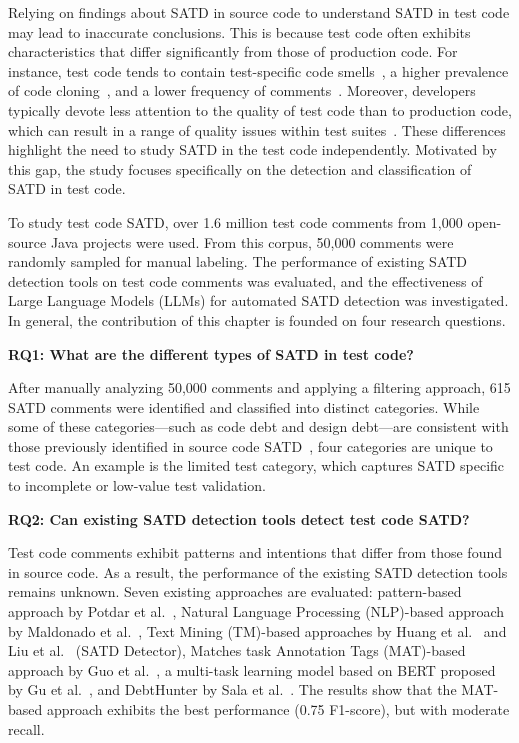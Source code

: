 Relying on findings about SATD in source code to understand SATD in test code may lead to inaccurate conclusions. This is because test code often exhibits characteristics that differ significantly from those of production code. For instance, test code tends to contain test-specific code smells~\cite{bavota_are_2015, tufano_empirical_2016}, a higher prevalence of code cloning~\cite{van_bladel_comparative_2023}, and a lower frequency of comments~\cite{counsell_comparing_2016}. Moreover, developers typically devote less attention to the quality of test code than to production code, which can result in a range of quality issues within test suites~\cite{counsell_comparing_2016, beller_developer_2019, beller_when_2015, zaidman_studying_2011, athanasiou_test_2014, spadini_relation_2018}. These differences highlight the need to study SATD in the test code independently. Motivated by this gap, the study focuses specifically on the detection and classification of SATD in test code.

 To study test code SATD, over 1.6 million test code comments from 1,000 open-source Java projects were used. From this corpus, 50,000 comments were randomly sampled for manual labeling. The performance of existing SATD detection tools on test code comments was evaluated, and the effectiveness of Large Language Models (LLMs) for automated SATD detection was investigated.
 In general, the contribution of this chapter is founded on four research questions.

\textbf{RQ1: What are the different types of SATD in test code?}

After manually analyzing 50,000 comments and applying a filtering approach, 615 SATD comments were identified and classified into \categoryCount{} distinct categories. While some of these categories—such as code debt and design debt—are consistent with those previously identified in source code SATD~\cite{maldonado_detecting_2015}, four categories are unique to test code. An example is the limited test category, which captures SATD specific to incomplete or low-value test validation.

\textbf{RQ2: Can existing SATD detection tools detect test code SATD?}

Test code comments exhibit patterns and intentions that differ from those found in source code. As a result, the performance of the existing SATD detection tools remains unknown. Seven existing approaches are evaluated: pattern-based approach by Potdar et al.~\cite{potdar_exploratory_2014}, Natural Language Processing (NLP)-based approach by Maldonado et al.~\cite{maldonado_using_2017}, Text Mining (TM)-based approaches by Huang et al.~\cite{huang_identifying_2018} and Liu et al.~\cite{liu_satd_2018} (SATD Detector), Matches task Annotation
Tags (MAT)-based approach by Guo et al.~\cite{guo_how_2021}, a multi-task learning model based on BERT proposed by Gu et al.~\cite{gu_self-admitted_2024}, and DebtHunter by Sala et al.~\cite{sala_debthunter_2021}. The results show that the MAT-based approach exhibits the best performance (0.75 F1-score), but with moderate recall.

